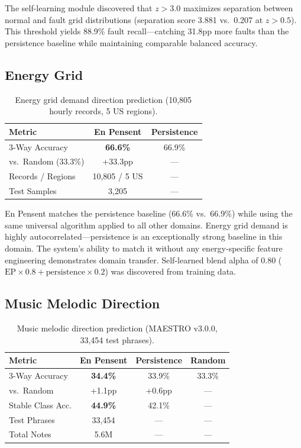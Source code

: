 \documentclass[11pt,a4paper]{article}
\begin{document}
The self-learning module discovered that $z > 3.0$ maximizes separation between
normal and fault grid distributions (separation score 3.881 vs.\ 0.207 at $z > 0.5$).
This threshold yields 88.9\% fault recall---catching 31.8pp more faults than the
persistence baseline while maintaining comparable balanced accuracy.

\subsection{Energy Grid}

\begin{table}[h]
\centering
\caption{Energy grid demand direction prediction (10,805 hourly records, 5 US regions).}
\label{tab:energy}
\begin{tabular}{lcc}
\toprule
\textbf{Metric} & \textbf{En Pensent} & \textbf{Persistence} \\
\midrule
3-Way Accuracy     & \textbf{66.6\%} & 66.9\% \\
vs.\ Random (33.3\%) & +33.3pp        & --- \\
Records / Regions  & 10,805 / 5 US  & --- \\
Test Samples       & 3,205          & --- \\
\bottomrule
\end{tabular}
\end{table}

En Pensent matches the persistence baseline (66.6\% vs.\ 66.9\%) while using the
same universal algorithm applied to all other domains. Energy grid demand is
highly autocorrelated---persistence is an exceptionally strong baseline in this
domain. The system's ability to match it without any energy-specific feature
engineering demonstrates domain transfer. Self-learned blend alpha of 0.80
($\text{EP}\times0.8 + \text{persistence}\times0.2$) was discovered from training data.

\subsection{Music Melodic Direction}

\begin{table}[h]
\centering
\caption{Music melodic direction prediction (MAESTRO v3.0.0, 33,454 test phrases).}
\label{tab:music}
\begin{tabular}{lccc}
\toprule
\textbf{Metric} & \textbf{En Pensent} & \textbf{Persistence} & \textbf{Random} \\
\midrule
3-Way Accuracy       & \textbf{34.4\%} & 33.9\% & 33.3\% \\
vs.\ Random          & +1.1pp          & +0.6pp & --- \\
Stable Class Acc.    & \textbf{44.9\%} & 42.1\% & --- \\
Test Phrases         & 33,454          & ---    & --- \\
Total Notes          & 5.6M            & ---    & --- \\
\bottomrule
\end{tabular}
\end{table}
\end{document}
